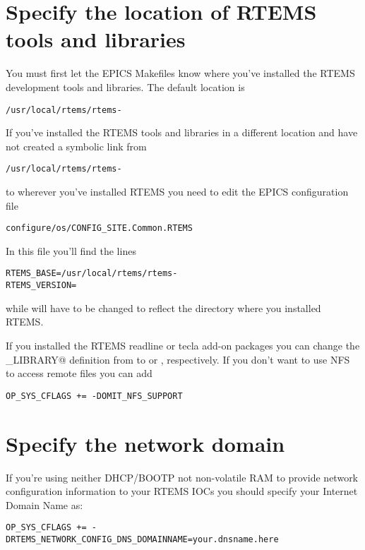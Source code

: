 \documentclass{report}
\begin{document}
\section{Specify the location of RTEMS tools and libraries}
You must first let the EPICS Makefiles know where you've installed
the RTEMS development tools and libraries.  The default location is
\begin{alltt}
/usr/local/rtems/rtems-\rtemsVersion
\end{alltt}
If you've installed the RTEMS tools and libraries in a different location and
have not created a symbolic link from
\begin{alltt}
/usr/local/rtems/rtems-\rtemsVersion
\end{alltt}
to wherever you've installed RTEMS you need to edit the EPICS configuration
file
\begin{verbatim}
configure/os/CONFIG_SITE.Common.RTEMS
\end{verbatim}
In this file you'll find the lines
\begin{alltt}
RTEMS_BASE=/usr/local/rtems/rtems-\rtemsVersion
RTEMS_VERSION=\rtemsVersion
\end{alltt}
while will have to be changed to reflect the directory where you installed RTEMS.

If you installed the RTEMS readline or tecla add-on packages you can
change the \verb@EPICSCOMMANDLINE_LIBRARY@ definition from \verb@EPICS@ to
\verb@READLINE@ or \verb@LIBTECLA@, respectively.
If you don't want to use NFS to access remote files you can add
\begin{verbatim}
OP_SYS_CFLAGS += -DOMIT_NFS_SUPPORT
\end{verbatim}

\section{Specify the network domain}
If you're using neither DHCP/BOOTP not non-volatile RAM to provide network
configuration information to your RTEMS IOCs you should
specify your Internet Domain Name as:
\begin{verbatim}
OP_SYS_CFLAGS += -DRTEMS_NETWORK_CONFIG_DNS_DOMAINNAME=your.dnsname.here
\end{verbatim}
\end{document}
